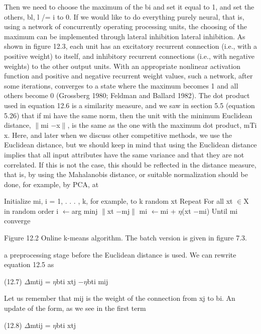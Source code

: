 Then we need to choose the maximum of the bi and set it equal to 1, and set the others, bl, l /= i to 0. If we would like to do everything purely neural, that is, using a network of concurrently operating processing units, the choosing of the maximum can be implemented through lateral inhibition lateral inhibition. As shown in figure 12.3, each unit has an excitatory recurrent connection (i.e., with a positive weight) to itself, and inhibitory recurrent connections (i.e., with negative weights) to the other output units. With an appropriate nonlinear activation function and positive and negative recurrent weight values, such a network, after some iterations, converges to a state where the maximum becomes 1 and all others become 0 (Grossberg 1980; Feldman and Ballard 1982). The dot product used in equation 12.6 is a similarity measure, and we saw in section 5.5 (equation 5.26) that if mi have the same norm, then the unit with the minimum Euclidean distance, $\parallel$mi $-$x$\parallel$, is the same as the one with the maximum dot product, mTi x. Here, and later when we discuss other competitive methods, we use the Euclidean distance, but we should keep in mind that using the Euclidean distance implies that all input attributes have the same variance and that they are not correlated. If this is not the case, this should be reflected in the distance measure, that is, by using the Mahalanobis distance, or suitable normalization should be done, for example, by PCA, at

Initialize mi, i = 1, . . . , k, for example, to k random xt Repeat For all xt $\in$X in random order i $\leftarrow$arg minj $\parallel$xt $-$mj$\parallel$ mi $\leftarrow$mi + $\eta$(xt $-$mi) Until mi converge

Figure 12.2 Online k-means algorithm. The batch version is given in figure 7.3.

a preprocessing stage before the Euclidean distance is used. We can rewrite equation 12.5 as

(12.7) $\Delta$mtij = $\eta$bti xtj $-$$\eta$bti mij

Let us remember that mij is the weight of the connection from xj to bi. An update of the form, as we see in the first term

(12.8) $\Delta$mtij = $\eta$bti xtj

